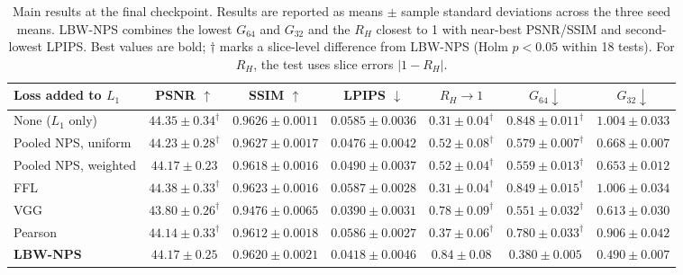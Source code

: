 \begin{table}[t]
\centering
\caption{Main results at the final checkpoint. Results are reported as means $\pm$ sample standard deviations across the three seed means. LBW-NPS combines the lowest $G_{64}$ and $G_{32}$ and the $R_H$ closest to 1 with near-best PSNR/SSIM and second-lowest LPIPS. Best values are bold; $\dagger$ marks a slice-level difference from LBW-NPS (Holm $p<0.05$ within 18 tests). For $R_H$, the test uses slice errors $|1-R_H|$.}
\label{tab:main}
\setlength{\tabcolsep}{3.2pt}
\begin{tabular}{lcccccc}
\toprule
Loss added to $L_1$ & PSNR $\uparrow$ & SSIM $\uparrow$ & LPIPS $\downarrow$ & $R_H\to1$ & $G_{64}\downarrow$ & $G_{32}\downarrow$ \\
\midrule
None ($L_1$ only) & $44.35\pm0.34^{\dagger}$ & $0.9626\pm0.0011$ & $0.0585\pm0.0036$ & $0.31\pm0.04^{\dagger}$ & $0.848\pm0.011^{\dagger}$ & $1.004\pm0.033$ \\
Pooled NPS, uniform & $44.23\pm0.28^{\dagger}$ & $\mathbf{0.9627\pm0.0017}$ & $0.0476\pm0.0042$ & $0.52\pm0.08^{\dagger}$ & $0.579\pm0.007^{\dagger}$ & $0.668\pm0.007$ \\
Pooled NPS, weighted & $44.17\pm0.23$ & $0.9618\pm0.0016$ & $0.0490\pm0.0037$ & $0.52\pm0.04^{\dagger}$ & $0.559\pm0.013^{\dagger}$ & $0.653\pm0.012$ \\
FFL & $\mathbf{44.38\pm0.33}^{\dagger}$ & $0.9623\pm0.0016$ & $0.0587\pm0.0028$ & $0.31\pm0.04^{\dagger}$ & $0.849\pm0.015^{\dagger}$ & $1.006\pm0.034$ \\
VGG & $43.80\pm0.26^{\dagger}$ & $0.9476\pm0.0065$ & $\mathbf{0.0390\pm0.0031}$ & $0.78\pm0.09^{\dagger}$ & $0.551\pm0.032^{\dagger}$ & $0.613\pm0.030$ \\
Pearson & $44.14\pm0.33^{\dagger}$ & $0.9612\pm0.0018$ & $0.0586\pm0.0027$ & $0.37\pm0.06^{\dagger}$ & $0.780\pm0.033^{\dagger}$ & $0.906\pm0.042$ \\
\textbf{LBW-NPS} & $44.17\pm0.25$ & $0.9620\pm0.0021$ & $0.0418\pm0.0046$ & $\mathbf{0.84\pm0.08}$ & $\mathbf{0.380\pm0.005}$ & $\mathbf{0.490\pm0.007}$ \\
\bottomrule
\end{tabular}
\end{table}
